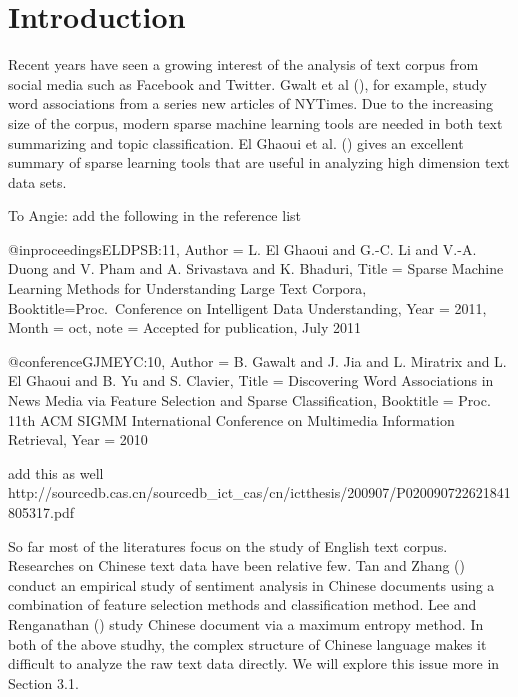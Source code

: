 \documentclass[11pt]{article}
\newcommand{\1}[1]{{\mathbf 1}\left\{#1\right\}}        %
\begin{document}
\section{Introduction}
Recent years have seen a growing interest of the analysis of text corpus from social media such as Facebook and Twitter. Gwalt et al (\cite{Gwalt}), for example, study word associations from a series new articles of NYTimes. Due to the increasing size of the corpus, modern sparse machine learning tools are needed in both text summarizing and topic classification. El Ghaoui et al. (\cite{ElGhaoui}) gives an excellent summary of sparse learning tools that are useful in analyzing high dimension text data sets.  

To Angie: add the following in the reference list

@inproceedings{ELDPSB:11,
  Author = {L. {El Ghaoui} and G.-C. Li and  V.-A. Duong and V. Pham and A. Srivastava and K. Bhaduri},
  Title = {Sparse Machine Learning Methods for Understanding Large Text Corpora},
  Booktitle={Proc.\ Conference on Intelligent Data Understanding},
  Year = {2011},
	Month = oct,
	note = {Accepted for publication, July 2011}
}

@conference{GJMEYC:10,
	Author = {B. Gawalt and J. Jia and L. Miratrix and L. {El Ghaoui} and B. Yu and S. Clavier},
	Title = {Discovering Word Associations in News Media
			via Feature Selection and Sparse Classification},
	Booktitle = {Proc. 11th ACM SIGMM International
	Conference on Multimedia Information Retrieval},
	Year = 2010
}

add this as well
http://sourcedb.cas.cn/sourcedb_ict_cas/cn/ictthesis/200907/P020090722621841805317.pdf


So far most of the literatures focus on the study of English text corpus. Researches on Chinese text data have been relative few. Tan and Zhang (\cite{Tan}) conduct an empirical study of sentiment analysis in Chinese documents using a combination of feature selection methods and classification method. Lee and Renganathan (\cite{lee2011chinese}) study Chinese document via a maximum entropy method. In both of the above studhy, the complex structure of Chinese language makes it difficult to analyze the raw text data directly. We will explore this issue more in Section 3.1. 
\end{document}

